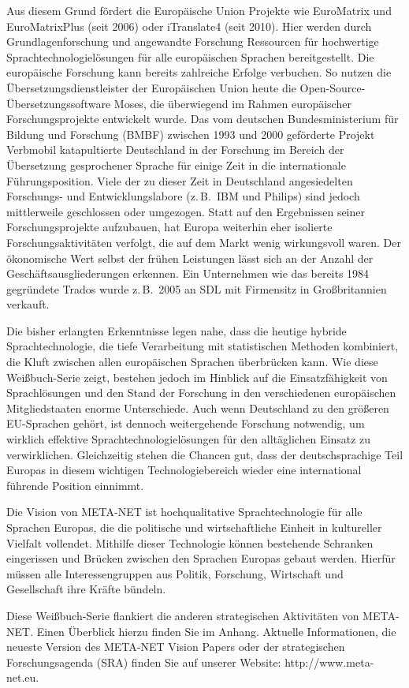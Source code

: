 \documentclass[]{../../metanetpaper}
\begin{document}
\begin{multicols}{2}
Aus diesem Grund fördert die Europäische Union Projekte wie EuroMatrix und EuroMatrixPlus (seit 2006) oder iTranslate4 (seit 2010). Hier werden durch Grundlagenforschung und angewandte Forschung Ressourcen für hochwertige Sprachtechnologielösungen für alle europäischen Sprachen bereitgestellt. Die europäische Forschung kann bereits zahlreiche Erfolge verbuchen. So nutzen die Übersetzungsdienstleister der Europäischen Union heute die Open-Source-Über\-set\-zungs\-soft\-ware Moses, die überwiegend im Rahmen europäischer Forschungsprojekte entwickelt wurde. Das vom deutschen Bundesministerium für Bildung und Forschung (BMBF) zwischen 1993 und 2000 geförderte Projekt Verbmobil katapultierte Deutschland in der Forschung im Bereich der Übersetzung gesprochener Sprache für einige Zeit in die internationale Führungsposition. Viele der zu dieser Zeit in Deutschland angesiedelten Forschungs- und Entwicklungslabore (z.\,B.~IBM und Philips) sind jedoch mittlerweile geschlossen oder umgezogen. Statt auf den Ergebnissen seiner Forschungsprojekte aufzubauen, hat Europa weiterhin eher isolierte Forschungsaktivitäten verfolgt, die auf dem Markt wenig wirkungsvoll waren. Der ökonomische Wert selbst der frühen Leistungen lässt sich an der Anzahl der Geschäftsausgliederungen erkennen. Ein Unternehmen wie das bereits 1984 gegründete Trados wurde z.\,B.~2005 an SDL mit Firmensitz in Großbritannien verkauft.


Die bisher erlangten Erkenntnisse legen nahe, dass die heutige hybride Sprachtechnologie, die tiefe Verarbeitung mit statistischen Methoden kombiniert, die Kluft zwischen allen europäischen Sprachen überbrücken kann. Wie diese Weißbuch-Serie zeigt, bestehen jedoch im Hinblick auf die Einsatzfähigkeit von Sprachlösungen und den Stand der Forschung in den verschiedenen europäischen Mitgliedstaaten enorme Unterschiede. Auch wenn Deutschland zu den größeren EU-Sprachen gehört, ist dennoch weitergehende Forschung notwendig, um wirklich effektive Sprachtechnologielösungen für den alltäglichen Einsatz zu verwirklichen. Gleichzeitig stehen die Chancen gut, dass der deutschsprachige Teil Europas in diesem wichtigen Technologiebereich wieder eine international führende Position einnimmt. 

Die Vision von META-NET ist hochqualitative Sprachtechnologie für alle Sprachen Europas, die die politische und wirtschaftliche Einheit in kultureller Vielfalt vollendet. Mithilfe dieser Technologie können bestehende Schranken eingerissen und Brücken zwischen den Sprachen Europas gebaut werden. Hierfür müssen alle Interessengruppen aus Politik, Forschung, Wirtschaft und Gesellschaft ihre Kräfte bündeln.

Diese Weißbuch-Serie flankiert die anderen strategischen Aktivitäten von META-NET. Einen Überblick hierzu finden Sie im Anhang. Aktuelle Informationen, die neueste Version des META-NET Vision Papers \cite{Meta1} oder der strategischen Forschungsagenda (SRA) finden Sie auf unserer Website: http://www.meta-net.eu.
\end{multicols}
\end{document}
